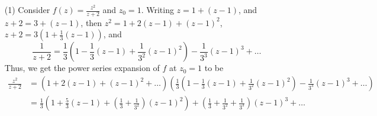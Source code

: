 \begin{example}\label{example_2.8}
    \begin{enumerate}
        \item[(1)] Consider $f(z)=\frac{z^2}{z+2}$ and $z_0=1$. Writing
            $z=1+(z-1)$, and $z+2=3+(z-1)$, then $z^2=1+2(z-1)+(z-1)^2$,
            $z+2=3(1+\frac{1}{3}(z-1))$, and
            \begin{equation*}
                \frac{1}{z+2}=\frac{1}{3}(1-\frac{1}{3}(z-1)+\frac{1}{3^2}(z-1)^2)
                -\frac{1}{3^3}(z-1)^3+\dots
            \end{equation*}
            Thus, we get the power series expansion of $f$ at $z_0=1$ to be
            \begin{align*}
                \frac{z^2}{z+2} &=  (1+2(z-1)+(z-1)^2+\dots)
                (\frac{1}{3}(1-\frac{1}{3}(z-1)+\frac{1}{3^2}(z-1)^2)
                -\frac{1}{3^3}(z-1)^3+\dots) \\
                                &= \frac{1}{3}(1+\frac{5}{3}(z-1)+
                                (\frac{1}{3}+\frac{1}{3^2})(z-1)^2)+
                                (\frac{1}{3}+\frac{1}{3^2}+\frac{1}{3^3})(z-1)^3+
                                \dots   \\
            \end{align*}
    \end{enumerate}
\end{example}

